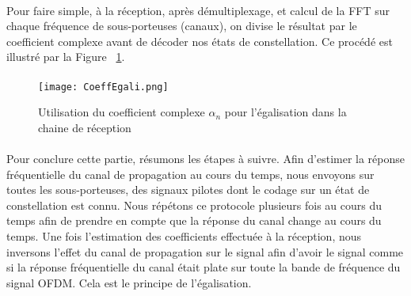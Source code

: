 \paragraph{}
Pour faire simple, à la réception, après démultiplexage, et calcul de la FFT sur chaque fréquence de sous-porteuses (canaux), on divise le résultat par le coefficient complexe avant de décoder nos états de constellation. Ce procédé est illustré par la Figure ~\ref{UtilCoeff}.

\paragraph{}
\vspace{1\baselineskip}
\begin{figure}[!h]
  \centering
  \texttt{[image: CoeffEgali.png]}
  \caption{Utilisation du coefficient complexe $\alpha_n$ pour l'égalisation dans la chaine de réception }
	\label{UtilCoeff}
\end{figure}
\vspace{2\baselineskip}

\paragraph{}
Pour conclure cette partie, résumons les étapes à suivre. Afin d'estimer la réponse fréquentielle du canal de propagation au cours du temps, nous envoyons sur toutes les sous-porteuses, des signaux pilotes dont le codage sur un état de constellation est connu. Nous répétons ce protocole plusieurs fois au cours du temps afin de prendre en compte que la réponse du canal change au cours du temps. Une fois l'estimation des coefficients effectuée à la réception, nous inversons l'effet du canal de propagation sur le signal afin d'avoir le signal comme si la réponse fréquentielle du canal était plate sur toute la bande de fréquence du signal OFDM. Cela est le principe de l'égalisation.

